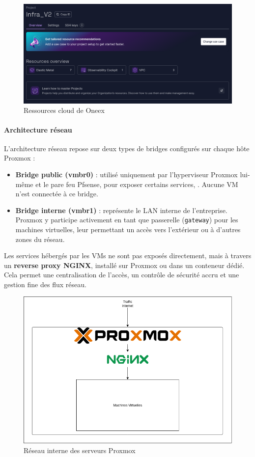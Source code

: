 \begin{figure} [H]
	\centering
	\includegraphics[width=.5\textwidth]{figures/Ressources cloud.png}
	\caption{Ressources cloud de Oneex}
	\label{fig:Ressources cloud de Oneex}
\end{figure}

\paragraph{Architecture réseau}

L’architecture réseau repose sur deux types de bridges configurés sur chaque hôte Proxmox :

\begin{itemize}
	\item \textbf{Bridge public (vmbr0)} : utilisé uniquement par l’hyperviseur Proxmox lui-même et le pare feu Pfsense, pour exposer certains services, . Aucune VM n’est connectée à ce bridge.
	\item \textbf{Bridge interne (vmbr1)} : représente le LAN interne de l’entreprise. Proxmox y participe activement en tant que passerelle (\texttt{gateway}) pour les machines virtuelles, leur permettant un accès vers l’extérieur ou à d’autres zones du réseau.
\end{itemize}

Les services hébergés par les VMs ne sont pas exposés directement, mais à travers un \textbf{reverse proxy NGINX}, installé sur Proxmox ou dans un conteneur dédié. Cela permet une centralisation de l’accès, un contrôle de sécurité accru et une gestion fine des flux réseau.

\begin{figure} [H]
	\centering
	\includegraphics[width=.5\textwidth]{figures/Reseau inter proxmox.png}
	\caption{Réseau interne des serveurs Proxmox}
	\label{fig:Réseau interne des serveurs Proxmox}
\end{figure}

